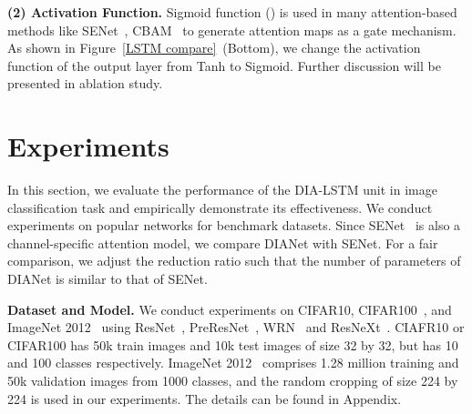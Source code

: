 \documentclass[letterpaper]{article} \usepackage{aaai20}  \usepackage{times}  \usepackage{helvet} \usepackage{courier}  \usepackage[hyphens]{url}  \usepackage{graphicx} \urlstyle{rm} \def\UrlFont{\rm}  \usepackage{graphicx}  \frenchspacing  \setlength{\pdfpagewidth}{8.5in}  \setlength{\pdfpageheight}{11in}  \usepackage{color}
\begin{document}
	
	\noindent\textbf{(2) Activation Function.} Sigmoid function () is used in many attention-based methods like SENet~\cite{hu2018squeeze}, CBAM~\cite{woo2018cbam} to generate attention maps as a gate mechanism. As shown in Figure~\ref{LSTM compare}~(Bottom), we change the activation function of the output layer from Tanh to Sigmoid. Further discussion will be presented in ablation study.
	\section{Experiments}
	\label{experiments}
	In this section, we evaluate the performance of the DIA-LSTM unit in image classification task and empirically demonstrate its effectiveness. We conduct experiments on popular networks for benchmark datasets. Since SENet~\cite{hu2018squeeze} is also a channel-specific attention model, we compare DIANet with SENet. For a fair comparison, we adjust the reduction ratio such that the number of parameters of DIANet is similar to that of SENet. 
	
	\textbf{Dataset and Model.} We conduct experiments on CIFAR10, CIFAR100~\cite{cifar}, and ImageNet 2012~\cite{ILSVRC15} using ResNet~\cite{he2016deep}, PreResNet~\cite{he2016identity}, WRN~\cite{wrn} and ResNeXt~\cite{xie2017aggregated}. CIAFR10 or CIFAR100 has 50k train images and 10k test images of size 32 by 32, but has 10 and 100 classes respectively. ImageNet 2012~\cite{ILSVRC15} comprises 1.28 million training and 50k validation images from 1000 classes, and the random cropping of size 224 by 224 is used in our experiments. The details can be found in Appendix. 
	
\end{document}
